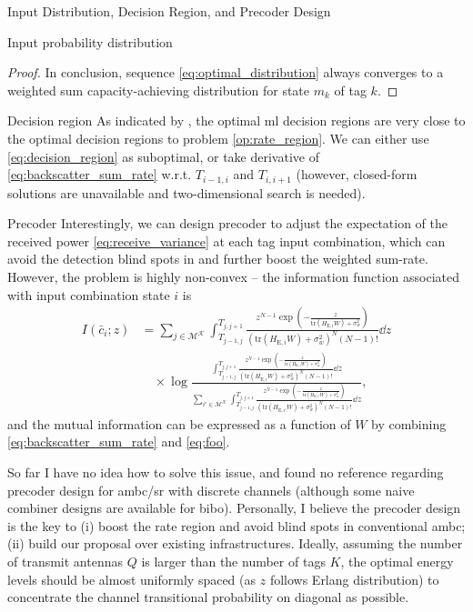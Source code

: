 \documentclass[journal]{IEEEtran}
\begin{document}
\begin{section}{Input Distribution, Decision Region, and Precoder Design}
\begin{subsection}{Input probability distribution}
\begin{proof}
				In conclusion, sequence \eqref{eq:optimal_distribution} always converges to a weighted sum capacity-achieving distribution for state $m_k$ of tag $k$.
			\end{proof}
		\end{subsection}


		\begin{subsection}{Decision region}
			As indicated by \cite{Qian2019b}, the optimal \gls{ml} decision regions are very close to the optimal decision regions to problem \eqref{op:rate_region}. We can either use \eqref{eq:decision_region} as suboptimal, or take derivative of \eqref{eq:backscatter_sum_rate} w.r.t. $T_{i-1,i}$ and $T_{i,i+1}$ (however, closed-form solutions are unavailable and two-dimensional search is needed).
		\end{subsection}

		\begin{subsection}{Precoder}
			Interestingly, we can design precoder to adjust the expectation of the received power \eqref{eq:receive_variance} at each tag input combination, which can avoid the detection blind spots in \cite{Qian2019} and further boost the weighted sum-rate. However, the problem is highly non-convex -- the information function associated with input combination state $i$ is
			\begin{align}
				I(\bar{c}_i;z)
				& = \sum_{j \in \mathcal{M^K}} \int_{T_{j-1,j}}^{T_{j,j+1}} \frac{z^{N-1} \exp \left(-\frac{z}{\mathrm{tr}(H_{\mathrm{E},i} W) + \sigma_w^2}\right)}{\left(\mathrm{tr}(H_{\mathrm{E},i} W) + \sigma_w^2\right)^N (N-1)!} \dd z\nonumber\\
				& \quad \times \log \frac{\int_{T_{j-1,j}}^{T_{j,j+1}} \frac{z^{N-1} \exp \left(-\frac{z}{\mathrm{tr}(H_{\mathrm{E},i} W) + \sigma_w^2}\right)}{\left(\mathrm{tr}(H_{\mathrm{E},i} W) + \sigma_w^2\right)^N (N-1)!} \dd z}{\sum_{i' \in \mathcal{M^K}} \int_{T_{j-1,j}}^{T_{j,j+1}} \frac{z^{N-1} \exp \left(-\frac{z}{\mathrm{tr}(H_{\mathrm{E},i'} W) + \sigma_w^2}\right)}{\left(\mathrm{tr}(H_{\mathrm{E},i'} W) + \sigma_w^2\right)^N (N-1)!} \dd z},
				\label{eq:foo}
			\end{align}
			and the mutual information can be expressed as a function of $W$ by combining \eqref{eq:backscatter_sum_rate} and \eqref{eq:foo}.

			So far I have no idea how to solve this issue, and found no reference regarding precoder design for \gls{ambc}/\gls{sr} with discrete channels (although some naive combiner designs are available for \gls{bibo}). Personally, I believe the precoder design is the key to (i) boost the rate region and avoid blind spots in conventional \gls{ambc}; (ii) build our proposal over existing infrastructures. Ideally, assuming the number of transmit antennas $Q$ is larger than the number of tags $K$, the optimal energy levels should be almost uniformly spaced (as $z$ follows Erlang distribution) to concentrate the channel transitional probability on diagonal as possible.
		\end{subsection}
	\end{section}
	
	
\end{document}
